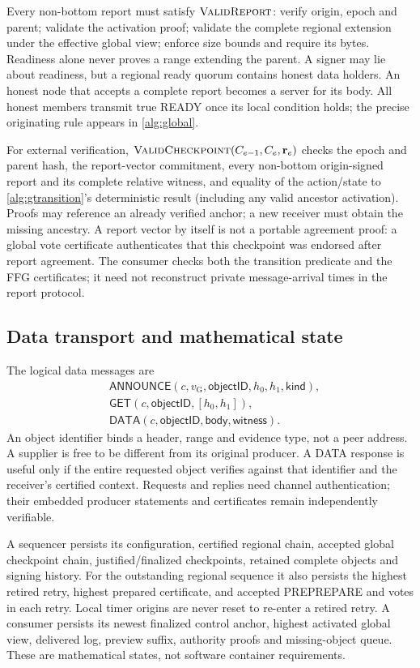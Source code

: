 \documentclass[11pt,a4paper,onecolumn]{article}
\newcommand{\gv}{v_{\mathrm G}}
\newcommand{\Tag}[1]{\mathsf{#1}}
\newcommand{\Proc}[1]{\textnormal{\textsc{#1}}}
\theoremstyle{remark}\newtheorem{example}[definition]{Example}
\newcounter{protocol}
\begin{document}
Every non-bottom report must satisfy $\Proc{ValidReport}$: verify origin,
epoch and parent; validate the activation proof; validate the complete regional
extension under the effective global view; enforce size bounds and require its
bytes. Readiness alone never proves a range extending the parent. A signer may
lie about readiness, but a regional ready quorum contains honest data holders.
An honest node that accepts a complete report becomes a server for its body.
All honest members transmit true READY once its local condition holds; the
precise originating rule appears in \cref{alg:global}.

For external verification, $\Proc{ValidCheckpoint}(C_{e-1},C_e,\mathbf r_e)$
checks the epoch and parent hash, the report-vector commitment, every non-bottom
origin-signed report and its complete relative witness, and equality of the
action/state to \cref{alg:gtransition}'s deterministic result (including any
valid ancestor activation). Proofs may reference an already verified anchor;
a new receiver must obtain the missing ancestry. A report vector by itself is
not a portable agreement proof: a global vote certificate authenticates that
this checkpoint was endorsed after report agreement. The consumer checks both
the transition predicate and the FFG certificates; it need not reconstruct
private message-arrival times in the report protocol.

\subsection{Data transport and mathematical state}\label{sec:transport}
The logical data messages are
\begin{align*}
 &\Tag{ANNOUNCE}(c,\gv,\mathsf{objectID},h_0,h_1,\mathsf{kind}),\\
 &\Tag{GET}(c,\mathsf{objectID},[h_0,h_1]),\\
 &\Tag{DATA}(c,\mathsf{objectID},\mathsf{body},\mathsf{witness}).
\end{align*}
An object identifier binds a header, range and evidence type, not a peer address.
A supplier is free to be different from its original producer. A DATA response
is useful only if the entire requested object verifies against that identifier
and the receiver's certified context. Requests and replies need channel
authentication; their embedded producer statements and certificates remain
independently verifiable.


A sequencer persists its configuration, certified regional chain, accepted
global checkpoint chain, justified/finalized checkpoints, retained complete
objects and signing history. For the outstanding regional sequence it also
persists the highest retired retry, highest prepared certificate, and accepted
PREPREPARE and votes in each retry. Local timer origins are never reset to
re-enter a retired retry. A consumer persists its newest finalized control
anchor, highest activated global view, delivered log, preview suffix, authority
proofs and missing-object queue. These are mathematical states, not software
container requirements.
\end{document}
